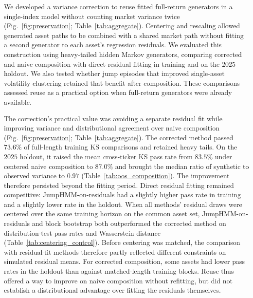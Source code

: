 We developed a variance correction to reuse fitted full-return
generators in a single-index model without counting market variance
twice (Fig.~\ref{fig:preservation}; Table~\ref{tab:aggregate}).
Centering and rescaling allowed generated asset paths to be combined
with a shared market path without fitting a second generator to each
asset's regression residuals. We evaluated this construction using
heavy-tailed hidden Markov generators, comparing corrected and naive
composition with direct residual fitting in training and on the
$2025$ holdout. We also tested whether jump episodes that improved
single-asset volatility clustering retained that benefit after
composition. These comparisons assessed reuse as a practical option
when full-return generators were already available.

The correction's practical value was avoiding a separate residual
fit while improving variance and distributional agreement over naive
composition (Fig.~\ref{fig:preservation};
Table~\ref{tab:aggregate}). The corrected method passed $73.6\%$ of
full-length training KS comparisons and retained heavy tails. On the
$2025$ holdout, it raised the mean cross-ticker KS pass rate from
$83.5\%$ under centered naive composition to $87.0\%$ and brought
the median ratio of synthetic to observed variance to $0.97$
(Table~\ref{tab:oos_composition}). The improvement therefore
persisted beyond the fitting period. Direct residual fitting remained
competitive: JumpHMM-on-residuals had a slightly higher pass rate in
training and a slightly lower rate in the holdout. When all methods'
residual draws were centered over the same training horizon on the
common asset set, JumpHMM-on-residuals and block bootstrap both
outperformed the corrected method on distribution-test pass rates and
Wasserstein distance (Table~\ref{tab:centering_control}). Before centering was matched, the comparison with residual-fit
methods therefore partly reflected different constraints on simulated
residual means. For corrected composition, some assets had lower pass rates in the
holdout than against matched-length training blocks. Reuse thus offered a way to improve
on naive composition without refitting, but did not establish a
distributional advantage over fitting the residuals themselves.

